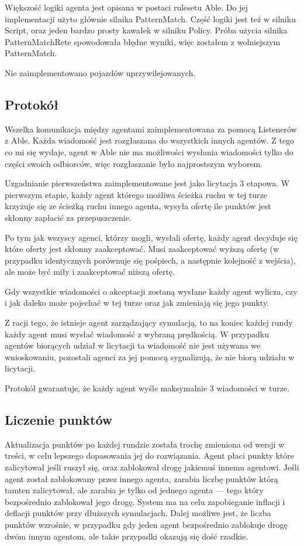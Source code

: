 \documentclass[11pt]{article}
\begin{document}
Większość logiki agenta jest opisana w postaci rulesetu Able. Do jej implementacji użyto głównie silnika PatternMatch. Część logiki jest też w silniku Script, oraz jeden bardzo prosty kawałek w silniku Policy. Próba użycia silnika PatternMatchRete spowodowała błędne wyniki, więc zostałem z wolniejszym PatternMatch.

Nie zaimplementowano pojazdów uprzywilejowanych.
\subsection{Protokół}
Wszelka komunikacja między agentami zaimplementowana za pomocą Listenerów z Able. Każda wiadomość jest rozgłaszana do wszystkich innych agentów. Z tego co mi się wydaje, agent w Able nie ma możliwości wysłania wiadomości tylko do części swoich odbiorców, więc rozgłaszanie było najprostszym wyborem.

Uzgadnianie pierwszeństwa zaimplementowane jest jako licytacja 3 etapowa. W pierwszym etapie, każdy agent którego możliwa ścieżka ruchu w tej turze krzyżuje się ze ścieżką ruchu innego agenta, wysyła ofertę ile punktów jest skłonny zapłacić za przepuszczenie.

Po tym jak wszyscy agenci, którzy mogli, wysłali ofertę, każdy agent decyduje się które oferty jest skłonny zaakceptować. Musi zaakceptować wyższą ofertę (w przypadku identycznych porównuje się pośpiech, a następnie kolejność z wejścia), ale może być miły i zaakceptować niższą ofertę.

Gdy wszystkie wiadomości o akceptacji zostaną wysłane każdy agent wylicza, czy i jak daleko może pojechać w tej turze oraz jak zmieniają się jego punkty.

Z racji tego, że istnieje agent zarządzający symulacją, to na koniec każdej rundy każdy agent musi wysłać wiadomość z wybraną prędkością. W przypadku agentów biorących udział w licytacji ta wiadomość nie jest używana we wnioskowaniu, pozostali agenci za jej pomocą sygnalizują, że nie biorą udziału w licytacji.

Protokół gwarantuje, że każdy agent wyśle maksymalnie 3 wiadomości w turze.

\subsection{Liczenie punktów}
Aktualizacja punktów po każdej rundzie została trochę zmieniona od wersji w treści, w celu lepszego dopasowania jej do rozwiązania. Agent płaci punkty które zalicytował jeśli ruszył się, oraz zablokował drogę jakiemuś innemu agentowi. Jeśli agent został zablokowany przez innego agenta, zarabia liczbę punktów którą tamten zalicytował, ale zarabia je tylko od jednego agenta --- tego który bezpośrednio zablokował jego drogę. System ma na celu zapobieganie inflacji i deflacji punktów przy dłuższych symulacjach. Dalej możliwe jest, że liczba punktów wzrośnie, w przypadku gdy jeden agent bezpośrednio zablokuje drogę dwóm innym agentom, ale takie przypadki okazują się dość rzadkie.
\end{document}
